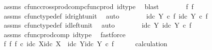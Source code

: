 \begin{isabellebody}
\ assms\ cfunc{\isacharunderscore}{\kern0pt}cross{\isacharunderscore}{\kern0pt}prod{\isacharunderscore}{\kern0pt}comp{\isacharunderscore}{\kern0pt}cfunc{\isacharunderscore}{\kern0pt}prod\ id{\isacharunderscore}{\kern0pt}type\ \isamarkupfalse%
\ blast\isanewline
\ \ \isamarkupfalse%
\ \isamarkupfalse%
\ {\isachardoublequoteopen}{\isachardot}{\kern0pt}{\isachardot}{\kern0pt}{\isachardot}{\kern0pt}\ {\isacharequal}{\kern0pt}\ {\isasymlangle}f{\isacharcomma}{\kern0pt}\ f{\isasymrangle}{\isachardoublequoteclose}\isanewline
\ \ \ \ \isamarkupfalse%
\ assms\ cfunc{\isacharunderscore}{\kern0pt}type{\isacharunderscore}{\kern0pt}def\ id{\isacharunderscore}{\kern0pt}right{\isacharunderscore}{\kern0pt}unit\ \isamarkupfalse%
\ auto\isanewline
\ \ \isamarkupfalse%
\ \isamarkupfalse%
\ {\isachardoublequoteopen}{\isachardot}{\kern0pt}{\isachardot}{\kern0pt}{\isachardot}{\kern0pt}\ {\isacharequal}{\kern0pt}\ {\isasymlangle}id\isactrlsub c\ Y\ {\isasymcirc}\isactrlsub c\ f{\isacharcomma}{\kern0pt}\ id\isactrlsub c\ Y\ {\isasymcirc}\isactrlsub c\ f{\isasymrangle}{\isachardoublequoteclose}\isanewline
\ \ \ \ \isamarkupfalse%
\ assms\ cfunc{\isacharunderscore}{\kern0pt}type{\isacharunderscore}{\kern0pt}def\ id{\isacharunderscore}{\kern0pt}left{\isacharunderscore}{\kern0pt}unit\ \isamarkupfalse%
\ auto\isanewline
\ \ \isamarkupfalse%
\ \isamarkupfalse%
\ {\isachardoublequoteopen}{\isachardot}{\kern0pt}{\isachardot}{\kern0pt}{\isachardot}{\kern0pt}\ {\isacharequal}{\kern0pt}\ {\isasymlangle}id\isactrlsub c\ Y{\isacharcomma}{\kern0pt}\ id\isactrlsub c\ Y{\isasymrangle}\ {\isasymcirc}\isactrlsub c\ f{\isachardoublequoteclose}\isanewline
\ \ \ \ \isamarkupfalse%
\ assms\ cfunc{\isacharunderscore}{\kern0pt}prod{\isacharunderscore}{\kern0pt}comp\ id{\isacharunderscore}{\kern0pt}type\ \isamarkupfalse%
\ fastforce\isanewline
\ \ \isamarkupfalse%
\ \isamarkupfalse%
\ {\isachardoublequoteopen}{\isacharparenleft}{\kern0pt}f\ {\isasymtimes}\isactrlsub f\ f{\isacharparenright}{\kern0pt}\ {\isasymcirc}\isactrlsub c\ {\isasymlangle}id\isactrlsub c\ X{\isacharcomma}{\kern0pt}id\isactrlsub c\ X{\isasymrangle}\ {\isacharequal}{\kern0pt}\ {\isasymlangle}id\isactrlsub c\ Y{\isacharcomma}{\kern0pt}id\isactrlsub c\ Y{\isasymrangle}\ {\isasymcirc}\isactrlsub c\ f{\isachardoublequoteclose}\isanewline
\ \ \ \ \isamarkupfalse%
\ calculation\ \isamarkupfalse%

\end{isabellebody}
